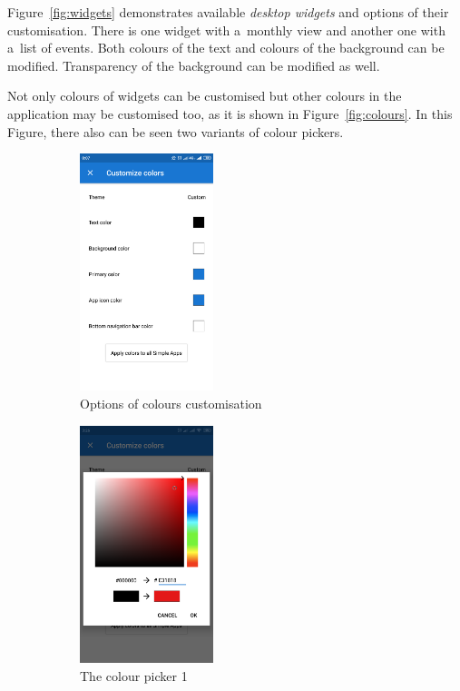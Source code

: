 \documentclass[a4paper, 11pt]{article}
\begin{document}
	Figure~\ref{fig:widgets} demonstrates available \emph{desktop widgets} 
	and options of their customisation. There is one widget with a~monthly
	view and another one with a~list of events. Both colours of the text
	and colours of the background can be modified. Transparency of the
	background can be modified as well.

	Not only colours of widgets can be customised but other colours in
	the application may be customised too, as it is shown in
	Figure~\ref{fig:colours}. In this Figure, there also can be seen two
	variants of colour pickers.

	\begin{figure}[ht]
		\centering

		\begin{subfigure}{.32 \textwidth}
			\centering
			\includegraphics[width=10.5em, frame]{img/custom_colours.png}
			\caption{Options of colours customisation}
		\end{subfigure}
%
		\begin{subfigure}{.32 \textwidth}
			\centering
			\includegraphics[width=10.5em, frame]{img/color_picker_1.png}
			\caption{The colour picker 1}
		\end{subfigure}
%
		\begin{subfigure}{.32 \textwidth}

\end{subfigure}
\end{figure}
\end{document}
